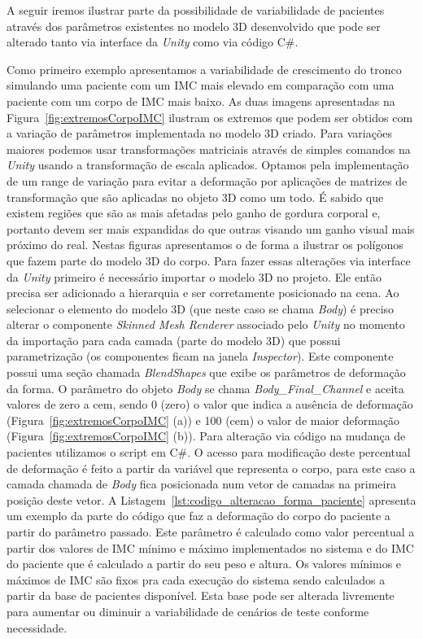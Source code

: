 A seguir iremos ilustrar parte da possibilidade de variabilidade de pacientes através dos parâmetros existentes no modelo 3D desenvolvido que pode ser alterado tanto via interface da \textit{Unity} como via código C\#. 

Como primeiro exemplo apresentamos a variabilidade de crescimento do tronco simulando uma paciente com um \acrshort{IMC} mais elevado em comparação com uma paciente com um corpo de \acrshort{IMC} mais baixo. As duas imagens apresentadas na Figura~\ref{fig:extremosCorpoIMC} ilustram os extremos que podem ser obtidos com a variação de parâmetros implementada no modelo 3D criado. Para variações maiores podemos usar transformações matriciais através de simples comandos na \textit{Unity} usando a transformação de escala aplicados. Optamos pela implementação de um range de variação para evitar a deformação por aplicações de matrizes de transformação que são aplicadas no objeto 3D como um todo. É sabido que existem regiões que são as mais afetadas pelo ganho de gordura corporal e, portanto devem ser mais expandidas do que outras visando um ganho visual mais próximo do real. Nestas figuras apresentamos o  de forma a ilustrar os polígonos que fazem parte do modelo 3D do corpo. Para fazer essas alterações via interface da \textit{Unity} primeiro é necessário importar o modelo 3D no projeto. Ele então precisa ser adicionado a hierarquia e ser corretamente posicionado na cena. Ao selecionar o elemento do modelo 3D (que neste caso se chama \textit{Body}) é preciso alterar o componente \textit{Skinned Mesh Renderer} associado pelo \textit{Unity} no momento da importação para cada camada (parte do modelo 3D) que possui parametrização (os componentes ficam na janela \textit{Inspector}). Este componente possui uma seção chamada \textit{BlendShapes} que exibe os parâmetros de deformação da forma. O parâmetro do objeto \textit{Body} se chama \textit{Body\_Final\_Channel} e aceita valores de zero a cem, sendo 0 (zero) o valor que indica a ausência de deformação (Figura~\ref{fig:extremosCorpoIMC} (a)) e 100 (cem) o valor de maior deformação (Figura~\ref{fig:extremosCorpoIMC} (b)). Para alteração via código na mudança de pacientes utilizamos o script em C\#. O acesso para modificação deste percentual de deformação é feito a partir da variável que representa o corpo, para este caso a camada chamada de \textit{Body} fica posicionada num vetor de camadas na primeira posição deste vetor. A Listagem~\ref{lst:codigo_alteracao_forma_paciente} apresenta um exemplo da parte do código que faz a deformação do corpo do paciente a partir do parâmetro passado. Este parâmetro é calculado como valor percentual a partir dos valores de \acrshort{IMC} mínimo e máximo implementados no sistema e do \acrshort{IMC} do paciente que é calculado a partir do seu peso e altura. Os valores mínimos e máximos de IMC são fixos pra cada execução do sistema sendo calculados a partir da base de pacientes disponível. Esta base pode ser alterada livremente para aumentar ou diminuir a variabilidade de cenários de teste conforme necessidade.

